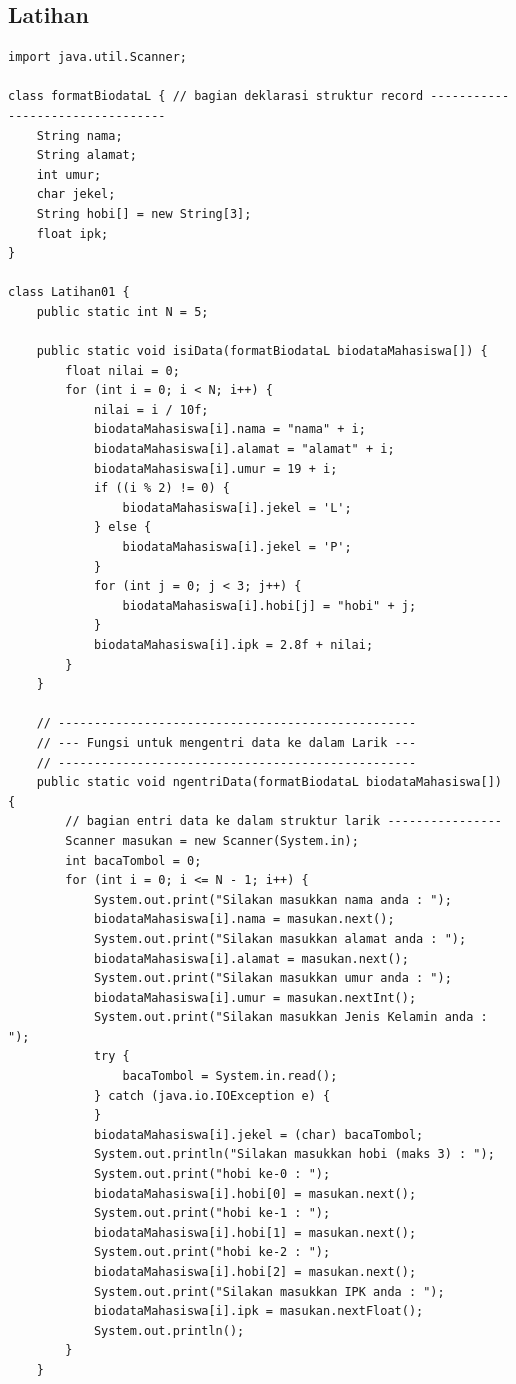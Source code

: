 \documentclass[a4paper,12pt]{article}
\begin{document}
\subsection{Latihan}
\begin{lstlisting}
import java.util.Scanner;

class formatBiodataL { // bagian deklarasi struktur record ---------------------------------
    String nama;
    String alamat;
    int umur;
    char jekel;
    String hobi[] = new String[3];
    float ipk;
}

class Latihan01 {
    public static int N = 5;

    public static void isiData(formatBiodataL biodataMahasiswa[]) {
        float nilai = 0;
        for (int i = 0; i < N; i++) {
            nilai = i / 10f;
            biodataMahasiswa[i].nama = "nama" + i;
            biodataMahasiswa[i].alamat = "alamat" + i;
            biodataMahasiswa[i].umur = 19 + i;
            if ((i % 2) != 0) {
                biodataMahasiswa[i].jekel = 'L';
            } else {
                biodataMahasiswa[i].jekel = 'P';
            }
            for (int j = 0; j < 3; j++) {
                biodataMahasiswa[i].hobi[j] = "hobi" + j;
            }
            biodataMahasiswa[i].ipk = 2.8f + nilai;
        }
    }

    // --------------------------------------------------
    // --- Fungsi untuk mengentri data ke dalam Larik ---
    // --------------------------------------------------
    public static void ngentriData(formatBiodataL biodataMahasiswa[]) {
        // bagian entri data ke dalam struktur larik ----------------
        Scanner masukan = new Scanner(System.in);
        int bacaTombol = 0;
        for (int i = 0; i <= N - 1; i++) {
            System.out.print("Silakan masukkan nama anda : ");
            biodataMahasiswa[i].nama = masukan.next();
            System.out.print("Silakan masukkan alamat anda : ");
            biodataMahasiswa[i].alamat = masukan.next();
            System.out.print("Silakan masukkan umur anda : ");
            biodataMahasiswa[i].umur = masukan.nextInt();
            System.out.print("Silakan masukkan Jenis Kelamin anda : ");
            try {
                bacaTombol = System.in.read();
            } catch (java.io.IOException e) {
            }
            biodataMahasiswa[i].jekel = (char) bacaTombol;
            System.out.println("Silakan masukkan hobi (maks 3) : ");
            System.out.print("hobi ke-0 : ");
            biodataMahasiswa[i].hobi[0] = masukan.next();
            System.out.print("hobi ke-1 : ");
            biodataMahasiswa[i].hobi[1] = masukan.next();
            System.out.print("hobi ke-2 : ");
            biodataMahasiswa[i].hobi[2] = masukan.next();
            System.out.print("Silakan masukkan IPK anda : ");
            biodataMahasiswa[i].ipk = masukan.nextFloat();
            System.out.println();
        }
    }


\end{lstlisting}
\end{document}
